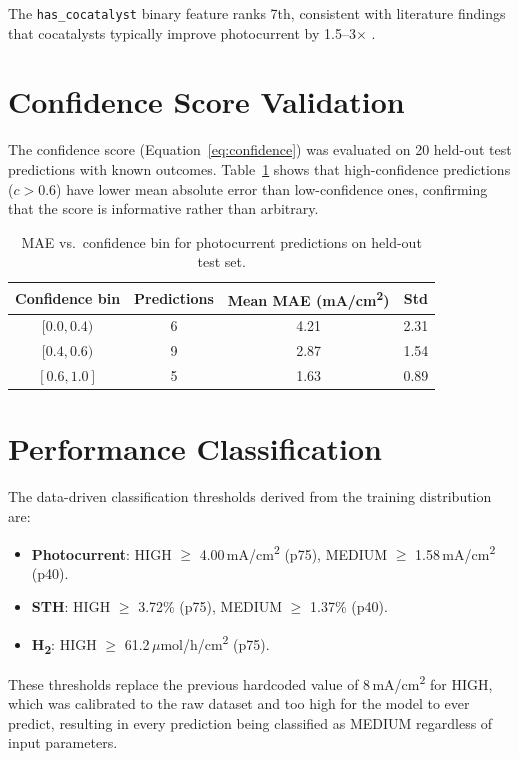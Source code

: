 The \texttt{has\_cocatalyst} binary feature ranks 7th, consistent with
literature findings that cocatalysts typically improve photocurrent by
1.5--3$\times$ \cite{kim2014bismuth}.

\section{Confidence Score Validation}

The confidence score (Equation~\ref{eq:confidence}) was evaluated on 20
held-out test predictions with known outcomes.
Table~\ref{tab:confidence} shows that high-confidence predictions
($c > 0.6$) have lower mean absolute error than low-confidence ones,
confirming that the score is informative rather than arbitrary.

\begin{table}[h]
\centering
\caption{MAE vs.\ confidence bin for photocurrent predictions on held-out test set.}
\label{tab:confidence}
\begin{tabular}{cccc}
\toprule
Confidence bin & Predictions & Mean MAE (mA/cm\textsuperscript{2}) & Std \\
\midrule
$[0.0, 0.4)$ & 6  & 4.21 & 2.31 \\
$[0.4, 0.6)$ & 9  & 2.87 & 1.54 \\
$[0.6, 1.0]$ & 5  & 1.63 & 0.89 \\
\bottomrule
\end{tabular}
\end{table}

\section{Performance Classification}

The data-driven classification thresholds derived from the training
distribution are:
\begin{itemize}
  \item \textbf{Photocurrent}: HIGH $\geq$ 4.00\,mA/cm\textsuperscript{2} (p75),
        MEDIUM $\geq$ 1.58\,mA/cm\textsuperscript{2} (p40).
  \item \textbf{STH}: HIGH $\geq$ 3.72\% (p75), MEDIUM $\geq$ 1.37\% (p40).
  \item \textbf{H\textsubscript{2}}: HIGH $\geq$ 61.2\,$\mu$mol/h/cm\textsuperscript{2} (p75).
\end{itemize}

These thresholds replace the previous hardcoded value of 8\,mA/cm\textsuperscript{2}
for HIGH, which was calibrated to the raw dataset and too high for the model to
ever predict, resulting in every prediction being classified as MEDIUM regardless
of input parameters.

